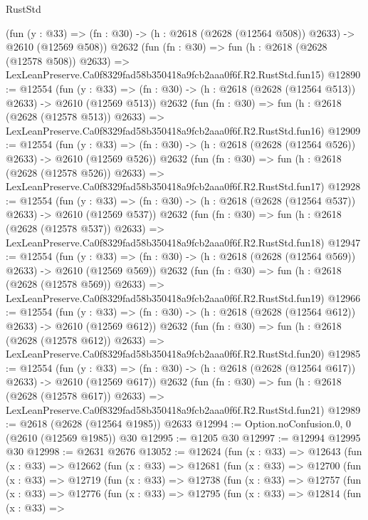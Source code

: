 \begin{lexlean}{RustStd}
\begin{coremodule}
    (fun (y : @33) => (fn : @30) -> (h : @2618 (@2628 (@12564 @508)) @2633) -> @2610 (@12569 @508))
    @2632
    (fun (fn : @30) =>
    fun (h : @2618 (@2628 (@12578 @508)) @2633) =>
    LexLeanPreserve.Ca0f8329fad58b350418a9fcb2aaa0f6f.R2.RustStd.fun15)
@12890 := @12554
    (fun (y : @33) => (fn : @30) -> (h : @2618 (@2628 (@12564 @513)) @2633) -> @2610 (@12569 @513))
    @2632
    (fun (fn : @30) =>
    fun (h : @2618 (@2628 (@12578 @513)) @2633) =>
    LexLeanPreserve.Ca0f8329fad58b350418a9fcb2aaa0f6f.R2.RustStd.fun16)
@12909 := @12554
    (fun (y : @33) => (fn : @30) -> (h : @2618 (@2628 (@12564 @526)) @2633) -> @2610 (@12569 @526))
    @2632
    (fun (fn : @30) =>
    fun (h : @2618 (@2628 (@12578 @526)) @2633) =>
    LexLeanPreserve.Ca0f8329fad58b350418a9fcb2aaa0f6f.R2.RustStd.fun17)
@12928 := @12554
    (fun (y : @33) => (fn : @30) -> (h : @2618 (@2628 (@12564 @537)) @2633) -> @2610 (@12569 @537))
    @2632
    (fun (fn : @30) =>
    fun (h : @2618 (@2628 (@12578 @537)) @2633) =>
    LexLeanPreserve.Ca0f8329fad58b350418a9fcb2aaa0f6f.R2.RustStd.fun18)
@12947 := @12554
    (fun (y : @33) => (fn : @30) -> (h : @2618 (@2628 (@12564 @569)) @2633) -> @2610 (@12569 @569))
    @2632
    (fun (fn : @30) =>
    fun (h : @2618 (@2628 (@12578 @569)) @2633) =>
    LexLeanPreserve.Ca0f8329fad58b350418a9fcb2aaa0f6f.R2.RustStd.fun19)
@12966 := @12554
    (fun (y : @33) => (fn : @30) -> (h : @2618 (@2628 (@12564 @612)) @2633) -> @2610 (@12569 @612))
    @2632
    (fun (fn : @30) =>
    fun (h : @2618 (@2628 (@12578 @612)) @2633) =>
    LexLeanPreserve.Ca0f8329fad58b350418a9fcb2aaa0f6f.R2.RustStd.fun20)
@12985 := @12554
    (fun (y : @33) => (fn : @30) -> (h : @2618 (@2628 (@12564 @617)) @2633) -> @2610 (@12569 @617))
    @2632
    (fun (fn : @30) =>
    fun (h : @2618 (@2628 (@12578 @617)) @2633) =>
    LexLeanPreserve.Ca0f8329fad58b350418a9fcb2aaa0f6f.R2.RustStd.fun21)
@12989 := @2618 (@2628 (@12564 @1985)) @2633
@12994 := Option.noConfusion.{0, 0} (@2610 (@12569 @1985)) @30
@12995 := @1205 @30
@12997 := @12994 @12995 @30
@12998 := @2631 @2676
@13052 := @12624
    (fun (x : @33) =>
    @12643
      (fun (x : @33) =>
      @12662
        (fun (x : @33) =>
        @12681
          (fun (x : @33) =>
          @12700
            (fun (x : @33) =>
            @12719
              (fun (x : @33) =>
              @12738
                (fun (x : @33) =>
                @12757
                  (fun (x : @33) =>
                  @12776
                    (fun (x : @33) =>
                    @12795
                      (fun (x : @33) =>
                      @12814
                        (fun (x : @33) =>

\end{coremodule}
\end{lexlean}
